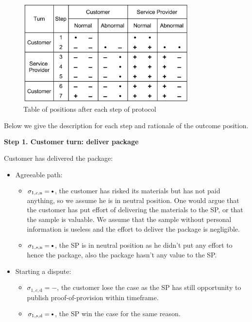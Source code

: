 \documentclass{ieeeaccess}
\newcommand\sbullet[1][.75]{\mathbin{\ThisStyle{\vcenter{\hbox{%
  \scalebox{#1}{$\SavedStyle\bullet$}}}}}%
}
\begin{document}
\begin{figure}[h!]
\includegraphics[width=9cm]{formal-table-of-positions.png}
\centering
\caption{Table of positions after each step of protocol}
\label{fig:positions}
\end{figure}


Below we give the description for each step and rationale of the outcome position.


\noindent \textbf
{Step 1. Customer turn: deliver package}\label{step-1-deliver-package}

Customer has delivered the package:

\begin{itemize}
\item
  Agreeable path:

  \begin{itemize}
  
  \item
    \(\sigma_{1, c, \mathrm{n}} = \sbullet\), the customer has risked its
    materials but has not paid anything, so we assume he is in neutral
    position. One would argue that the customer has put effort of
    delivering the materials to the SP, or that the sample is valuable.
    We assume that the sample without personal information is useless
    and the effort to deliver the package is negligible.
  \item
    \(\sigma_{1, s, \mathrm{n}} = \sbullet\), the SP is in neutral position as he didn't put any effort to hence the package, also the package hasn't any value to the SP.
  \end{itemize}
\item
  Starting a dispute:

  \begin{itemize}
  
  \item
    \(\sigma_{1, c, \mathrm{d}} = -\), the customer lose the case as the SP has still opportunity to publish proof-of-provision within timeframe.
  \item
    \(\sigma_{1, s, \mathrm{d}} = \sbullet\), the SP win the case for the same reason.
  \end{itemize}
\end{itemize}
\end{document}
